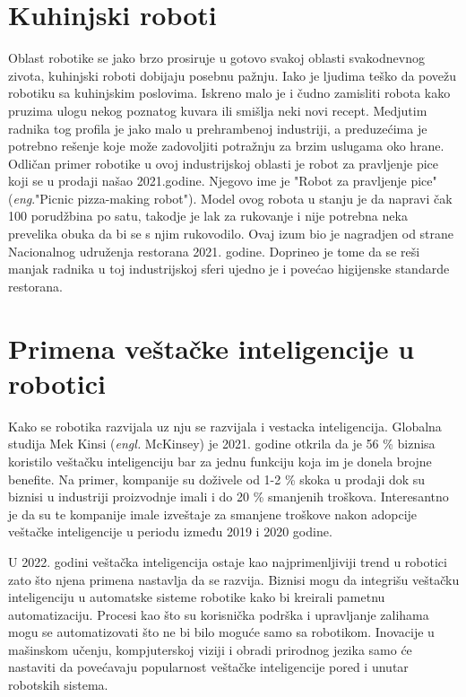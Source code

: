 \documentclass{article}
\begin{document}
\section{Kuhinjski roboti}
Oblast robotike se jako brzo prosiruje u gotovo svakoj oblasti svakodnevnog zivota, kuhinjski roboti dobijaju posebnu pažnju. Iako je ljudima teško da povežu robotiku sa kuhinjskim poslovima. Iskreno malo je i čudno zamisliti robota kako pruzima ulogu nekog poznatog kuvara ili smišlja neki novi recept. Medjutim radnika tog profila je jako malo u prehrambenoj industriji, a preduzećima je potrebno rešenje koje može zadovoljiti potražnju za brzim uslugama oko hrane. Odličan primer robotike u ovoj industrijskoj oblasti je robot za pravljenje pice koji se u prodaji našao 2021.godine. Njegovo ime je "Robot za pravljenje pice" (\emph{eng}."Picnic pizza-making robot")\cite{robotics2022}. Model ovog robota u stanju je da napravi čak 100 porudžbina po satu, takodje je lak za rukovanje i nije potrebna neka prevelika obuka da bi se s njim rukovodilo. Ovaj izum bio je nagradjen od strane Nacionalnog udruženja restorana 2021. godine. Doprineo je tome da se reši manjak radnika u toj industrijskoj sferi ujedno je i povećao higijenske standarde restorana.\cite{foodservice robots}


\section{Primena veštačke inteligencije u robotici}
Kako se robotika razvijala uz nju se razvijala i vestacka inteligencija. Globalna studija Mek Kinsi (\emph{engl. }McKinsey)\cite{McKinsey} je 2021. godine
otkrila da je 56 \% biznisa koristilo veštačku inteligenciju bar za jednu funkciju koja im je donela brojne benefite. Na primer, kompanije su doživele od 1-2 \% skoka u prodaji dok su biznisi u industriji proizvodnje
imali i do 20 \% smanjenih troškova. Interesantno je da su te kompanije imale izveštaje za smanjene troškove nakon adopcije veštačke inteligencije
u periodu između 2019 i 2020 godine.\par
U 2022. godini veštačka inteligencija ostaje kao najprimenljiviji trend u robotici zato što njena primena nastavlja da se razvija. Biznisi mogu da integrišu veštačku inteligenciju u automatske sisteme robotike kako bi
kreirali pametnu automatizaciju. Procesi kao što su korisnička podrška i upravljanje zalihama mogu se  automatizovati što ne bi bilo moguće samo sa robotikom. Inovacije u mašinskom učenju, kompjuterskoj viziji i obradi prirodnog jezika samo će nastaviti da povećavaju popularnost veštačke inteligencije pored i unutar robotskih sistema.\cite{robotics2022} 
\end{document}
